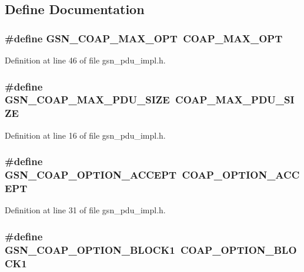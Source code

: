 \subsection{Define Documentation}
\hypertarget{a00538_ae122b98ec30473a73d0c6350bbffb76f}{
\subsubsection[{GSN\_\-COAP\_\-MAX\_\-OPT}]{\setlength{\rightskip}{0pt plus 5cm}\#define GSN\_\-COAP\_\-MAX\_\-OPT~COAP\_\-MAX\_\-OPT}}
\label{a00538_ae122b98ec30473a73d0c6350bbffb76f}


Definition at line 46 of file gsn\_\-pdu\_\-impl.h.

\hypertarget{a00538_acc4ca49ca61a25e4f6b3de9c18778f04}{
\subsubsection[{GSN\_\-COAP\_\-MAX\_\-PDU\_\-SIZE}]{\setlength{\rightskip}{0pt plus 5cm}\#define GSN\_\-COAP\_\-MAX\_\-PDU\_\-SIZE~COAP\_\-MAX\_\-PDU\_\-SIZE}}
\label{a00538_acc4ca49ca61a25e4f6b3de9c18778f04}


Definition at line 16 of file gsn\_\-pdu\_\-impl.h.

\hypertarget{a00538_a9f67829749b7a93afd48b320975d5c3f}{
\subsubsection[{GSN\_\-COAP\_\-OPTION\_\-ACCEPT}]{\setlength{\rightskip}{0pt plus 5cm}\#define GSN\_\-COAP\_\-OPTION\_\-ACCEPT~COAP\_\-OPTION\_\-ACCEPT}}
\label{a00538_a9f67829749b7a93afd48b320975d5c3f}


Definition at line 31 of file gsn\_\-pdu\_\-impl.h.

\hypertarget{a00538_a811ef0ca4fd74ece7dfa87b2b9bb6ca1}{
\subsubsection[{GSN\_\-COAP\_\-OPTION\_\-BLOCK1}]{\setlength{\rightskip}{0pt plus 5cm}\#define GSN\_\-COAP\_\-OPTION\_\-BLOCK1~COAP\_\-OPTION\_\-BLOCK1}}
\label{a00538_a811ef0ca4fd74ece7dfa87b2b9bb6ca1}


